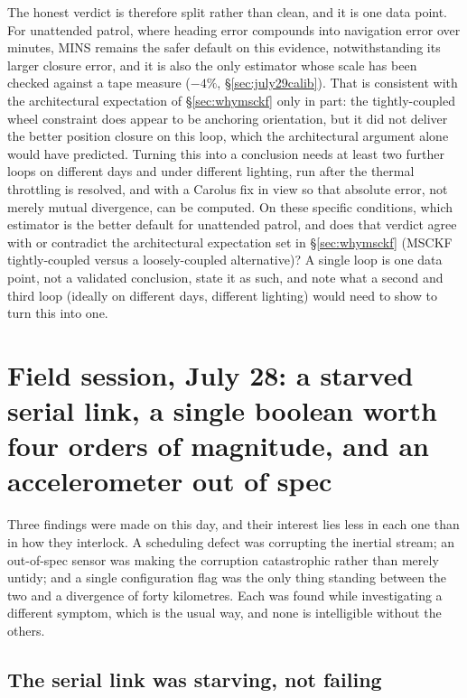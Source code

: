\begin{itemize}
  The honest verdict is therefore split rather than clean, and it is one data
  point. For unattended patrol, where heading error compounds into
  navigation error over minutes, MINS remains the safer default on this
  evidence, notwithstanding its larger closure error, and it is also the only
  estimator whose scale has been checked against a tape measure
  ($-4\%$, \S\ref{sec:july29calib}). That is consistent with the
  architectural expectation of \S\ref{sec:whymsckf} only in part: the
  tightly-coupled wheel constraint does appear to be anchoring orientation,
  but it did not deliver the better position closure on this loop, which the
  architectural argument alone would have predicted. Turning this into a
  conclusion needs at least two further loops on different days and under
  different lighting, run after the thermal throttling is resolved, and with
  a Carolus fix in view so that absolute error, not merely mutual
  divergence, can be computed. On
  these specific conditions, which estimator is the better default for
  unattended patrol, and does that verdict agree with or contradict the
  architectural expectation set in \S\ref{sec:whymsckf} (MSCKF
  tightly-coupled versus a loosely-coupled alternative)? A single loop is
  one data point, not a validated conclusion, state it as such, and note
  what a second and third loop (ideally on different days, different
  lighting) would need to show to turn this into one.
\end{itemize}

\section{Field session, July 28: a starved serial link, a single boolean
worth four orders of magnitude, and an accelerometer out of spec}
\label{sec:july28}

Three findings were made on this day, and their interest lies less in each
one than in how they interlock. A scheduling defect was corrupting the
inertial stream; an out-of-spec sensor was making the corruption
catastrophic rather than merely untidy; and a single configuration flag was
the only thing standing between the two and a divergence of forty kilometres.
Each was found while investigating a different symptom, which is the usual
way, and none is intelligible without the others.

\subsection{The serial link was starving, not failing}
\label{sec:uartrtprio}

